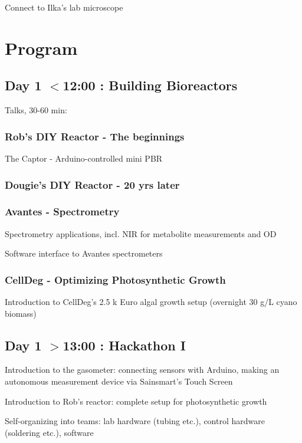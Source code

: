 \documentclass[12pt,a4paper]{article}
\begin{document}
Connect to Ilka's lab microscope


\newpage

\section{Program}

\subsection{Day 1 $<$12:00 : Building Bioreactors}

Talks, 30-60 min:

\subsubsection{Rob's DIY Reactor - The beginnings}

The Captor - Arduino-controlled mini PBR

\subsubsection{Dougie's DIY Reactor - 20 yrs later}
\subsubsection{Avantes - Spectrometry}

Spectrometry applications, incl. NIR for metabolite measurements and OD

Software interface to Avantes spectrometers

\subsubsection{CellDeg - Optimizing Photosynthetic Growth}

Introduction to CellDeg's 2.5 k Euro algal growth setup (overnight 30 g/L
cyano biomass)

\subsection{Day 1 $>$13:00 : Hackathon I}

Introduction to the gasometer: connecting sensors with Arduino,
making an autonomous measurement device via Sainsmart's Touch Screen

Introduction to Rob's reactor: complete setup for photosynthetic growth

Self-organizing into teams: lab hardware (tubing etc.), control hardware
(soldering etc.), software
\end{document}
